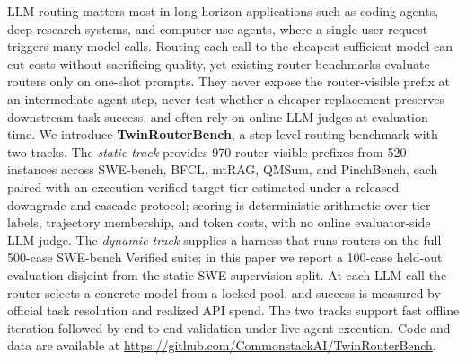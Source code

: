 LLM routing matters most in long-horizon applications such as coding agents,
deep research systems, and computer-use agents, where a single user request
triggers many model calls. Routing each call to the cheapest sufficient model can cut
costs without sacrificing quality, yet existing router benchmarks evaluate
routers only on one-shot prompts. They never expose the router-visible
prefix at an intermediate agent step, never test whether a cheaper replacement
preserves downstream task success, and often rely on online LLM judges at
evaluation time.
We introduce \textbf{TwinRouterBench}, a step-level routing benchmark with two
tracks. The \emph{static track} provides 970 router-visible prefixes from 520
instances across SWE-bench, BFCL, mtRAG, QMSum, and PinchBench, each paired
with an execution-verified target tier estimated under a released
downgrade-and-cascade protocol; scoring is deterministic arithmetic
over tier labels, trajectory membership, and token costs, with no online
evaluator-side LLM judge.
The \emph{dynamic track} supplies a harness that runs routers on the full
500-case SWE-bench Verified suite; in this paper we report a 100-case
held-out evaluation disjoint from the static SWE supervision split. At each
LLM call the router selects a concrete model from a locked pool, and success
is measured by official task resolution and realized API spend. The two
tracks support fast offline iteration followed by end-to-end validation
under live agent execution. Code and data are available at
\url{https://github.com/CommonstackAI/TwinRouterBench}.
